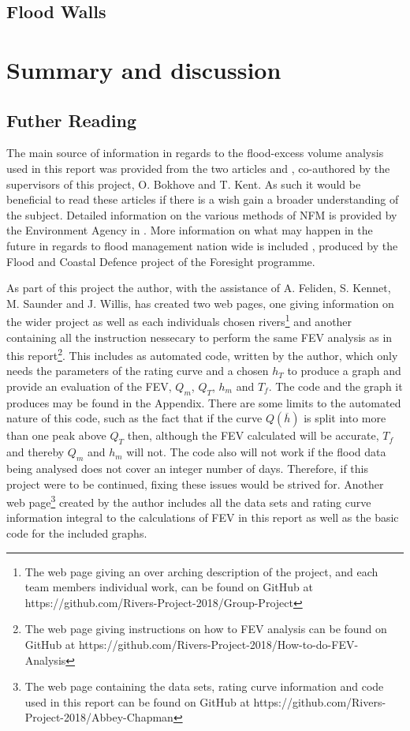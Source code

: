 \documentclass[11pt,a4paper]{article}
\begin{document}
\subsection{Flood Walls}


\newpage
\section{Summary and discussion}

\subsection{Futher Reading}
The main source of information in regards to the flood-excess volume analysis used in this report was provided from the two articles \cite{Aire} and \cite{Calder-Don}, co-authored by the supervisors of this project, O. Bokhove and T. Kent. As such it would be beneficial to read these articles if there is a wish gain a broader understanding of the subject. Detailed information on the various methods of NFM is provided by the Environment Agency in \cite{nfm}. More information on what may happen in the future in regards to flood management nation wide is included \cite{foresight}, produced by the Flood and Coastal Defence project of the Foresight programme.

As part of this project the author, with the assistance of A. Feliden, S. Kennet, M. Saunder and J. Willis, has created two web pages, one giving information on the wider project as well as each individuals chosen rivers\footnote{The web page giving an over arching description of the project, and each team members individual work, can be found on GitHub at https://github.com/Rivers-Project-2018/Group-Project} and another  containing all the instruction nessecary to perform the same FEV analysis as in this report\footnote{The web page giving instructions on how to FEV analysis can be found on GitHub at https://github.com/Rivers-Project-2018/How-to-do-FEV-Analysis}. This includes as automated code, written by the author, which only needs the parameters of the rating curve and a chosen $h_T$ to produce a graph and provide an evaluation of the FEV, $Q_m$, $Q_T$, $h_m$ and $T_f$. The code and the graph it produces may be found in the Appendix. There are some limits to the automated nature of this code, such as the fact that if the curve $Q(\overline{h})$ is split into more than one peak above $Q_T$ then, although the FEV calculated will be accurate, $T_f$ and thereby $Q_m$ and $h_m$ will not. The code also will not work if the flood data being analysed does not cover an integer number of days. Therefore, if this project were to be continued, fixing these issues would be strived for. Another web page\footnote{The web page containing the data sets, rating curve information and code used in this report can be found on GitHub at https://github.com/Rivers-Project-2018/Abbey-Chapman} created by the author includes all the data sets and rating curve information integral to the calculations of FEV in this report as well as the basic code for the included graphs.
\end{document}
